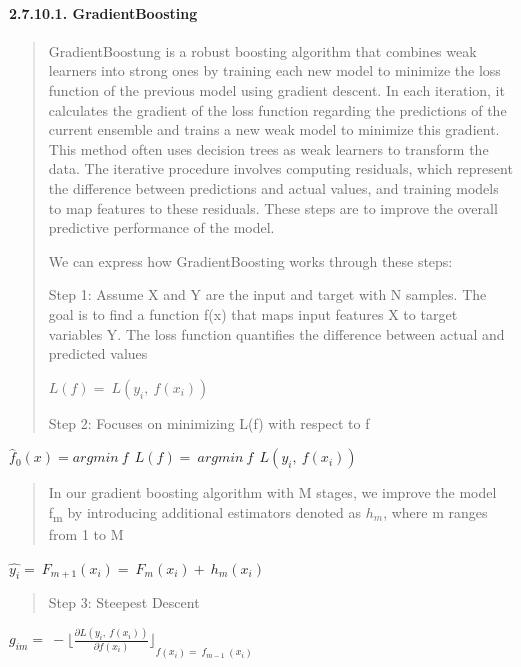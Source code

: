 \documentclass[
]{article}
\begin{document}
\hypertarget{gradientboosting}{%
\paragraph{\texorpdfstring{\textbf{2.7.10.1.
GradientBoosting}}{2.7.10.1. GradientBoosting}}\label{gradientboosting}}

\begin{quote}
GradientBoostung is a robust boosting algorithm that combines weak
learners into strong ones by training each new model to minimize the
loss function of the previous model using gradient descent. In each
iteration, it calculates the gradient of the loss function regarding the
predictions of the current ensemble and trains a new weak model to
minimize this gradient. This method often uses decision trees as weak
learners to transform the data. The iterative procedure involves
computing residuals, which represent the difference between predictions
and actual values, and training models to map features to these
residuals. These steps are to improve the overall predictive performance
of the model.

We can express how GradientBoosting works through these steps:

Step 1: Assume X and Y are the input and target with N samples. The goal
is to find a function f(x) that maps input features X to target
variables Y. The loss function quantifies the difference between actual
and predicted values

\(L(f) = \ L(y_{i},\ f\left( x_{i} \right))\)

Step 2: Focuses on minimizing L(f) with respect to f
\end{quote}

\({\widehat{f}}_{0}(x) = argmin\ f\ \ L(f) = \ argmin\ f\ \ L(y_{i},\ f\left( x_{i} \right))\)

\begin{quote}
In our gradient boosting algorithm with M stages, we improve the model
f\textsubscript{m} by introducing additional estimators denoted as
\(h_{m}\), where m ranges from 1 to M
\end{quote}

\(\widehat{y_{i}} = \ F_{m + 1}\left( x_{i} \right) = \ F_{m}\left( x_{i} \right) + \ h_{m}\left( x_{i} \right)\)

\begin{quote}
Step 3: Steepest Descent
\end{quote}

\(g_{im} = \  - {\lfloor\frac{\partial L(y_{i},\ f\left( x_{i} \right))}{\partial f(x_{i})}\rfloor}_{f\left( x_{i} \right) = \ f_{m - 1}\ (x_{i})}\)
\end{document}
